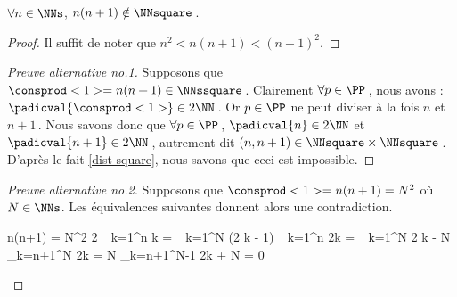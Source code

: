 \begin{fact} \label{case-2}
	 $\forall n \in \NNs$, $n(n+1) \notin \NNsquare$\,.
\end{fact}




\begin{proof}
	Il suffit de noter que $n^2 < n(n+1) < (n+1)^2$.
\end{proof}




\begin{proof}[Preuve alternative no.1]
    Supposons que $\consprod<1> = n(n+1) \in \NNssquare$\,.
    Clairement $\forall p \in \PP$\,, nous avons : $\padicval{\consprod<1>} \in 2 \NN$\,.
    Or $p \in \PP$ ne peut diviser à la fois $n$ et $n+1$\,.
    Nous savons donc que $\forall p \in \PP$\,, 
    $\padicval{n} \in 2 \NN$ et $\padicval{n+1} \in 2 \NN$\,,
    autrement dit 
    $(n, n + 1) \in \NNsquare \times \NNsquare$\,.
    D'après le fait \ref{dist-square}, nous savons que ceci est impossible.
\end{proof}




\begin{proof}[Preuve alternative no.2]
     Supposons que $\consprod<1> = n(n+1) = N^2$ où $N \in \NNs$.
     Les équivalences suivantes donnent alors une contradiction.
	
	\medskip
	
	\begin{stepcalc}[style = ar*, ope = \iff]
		n(n+1) = N^2
		2 \dsum_{k=1}^{n} k = \dsum_{k=1}^{N} (2 k - 1)
	\explnext{}
		\dsum_{k=1}^{n} 2k = \dsum_{k=1}^{N} 2 k - N
		\dsum_{k=n+1}^{N} 2k = N
		\dsum_{k=n+1}^{N-1} 2k + N = 0
	\end{stepcalc}

	\vspace{-2ex}	
	\leavevmode
\end{proof}
